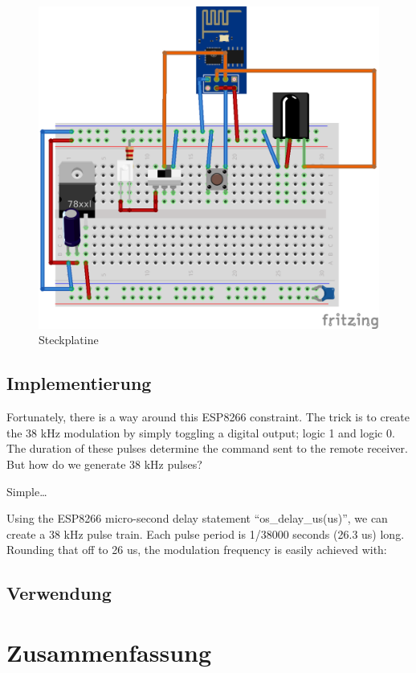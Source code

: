 \begin{figure}
	\centering
	\includegraphics[scale=1]{Abbildungen/ESP8266_Steckplatine}
	\caption{Steckplatine}
	\label{fig:Steckplatine}
\end{figure}





\subsection{Implementierung}
Fortunately, there is a way around this ESP8266 constraint. The trick is to create the 38 kHz modulation by simply toggling a digital output; logic 1 and logic 0. The duration of these pulses determine the command sent to the remote receiver. But how do we generate 38 kHz pulses?

Simple…

Using the ESP8266 micro-second delay statement “os\_delay\_us(us)”, we can create a 38 kHz pulse train. Each pulse period is 1/38000 seconds (26.3 us) long. Rounding that off to 26 us, the modulation frequency is easily achieved with:

\subsection{Verwendung}
\section{Zusammenfassung}
\pagestyle{empty}										%
